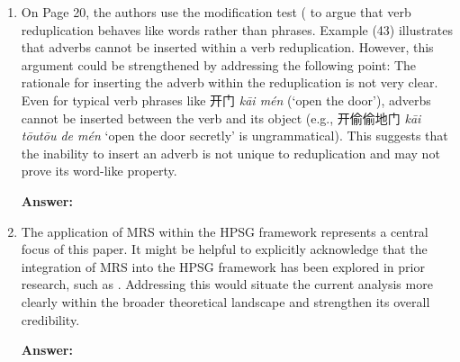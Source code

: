 \documentclass[fleqn,twoside]{article}
\begin{document}
\begin{enumerate}
    \item On Page 20, the authors use the modification test (\citep{Dai1992} to argue that verb reduplication behaves like words rather than phrases. Example (43) illustrates that adverbs cannot be inserted within a verb reduplication. However, this argument could be strengthened by addressing the following point: The rationale for inserting the adverb within the reduplication is not very clear. Even for typical verb phrases like 开门 \textit{kāi mén} (`open the door'), adverbs cannot be inserted between the verb and its
    object (e.g., 开偷偷地门 \textit{kāi tōutōu de mén} `open the door secretly' is ungrammatical).
    This suggests that the inability to insert an adverb is not unique to reduplication and may not prove its word-like property.
    
    \noindent
    \textbf{Answer:}
    
    \item The application of MRS within the HPSG framework represents a central focus of this paper. It might be helpful to explicitly acknowledge that the integration of MRS into the HPSG framework has been explored in prior research, such as \citet{Copestakeetal2005}. Addressing this would situate the current analysis more clearly within the broader theoretical landscape and strengthen its overall credibility.
    
    \noindent
    \textbf{Answer:}
    
    
\end{enumerate}

    

{\sloppy
\printbibliography[heading=subbibliography,notkeyword=this]
}
\end{document}
